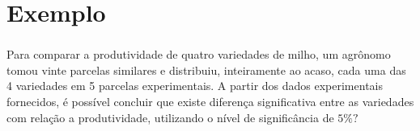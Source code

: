 \documentclass[14pt,aspectratio=1610]{beamer}
\begin{document}
\section{Exemplo}
\begin{frame}{}
\frametitle{}
\begin{block}{}
\justifying
Para comparar a produtividade de quatro variedades de milho, um agrônomo tomou
vinte parcelas similares e distribuiu, inteiramente ao acaso, cada uma das 4 variedades em 5 parcelas experimentais. A partir dos dados experimentais fornecidos, é possível concluir que existe diferença significativa entre as variedades com relação a produtividade, utilizando o nível de significância de $5\%?$
\vspace{-0.5cm}
\begin{table}[!h]
\end{table}
\end{block}
\end{frame}

\begin{frame}{}
\frametitle{}
\begin{block}{}
\justifying


\end{block}
\end{frame}

\begin{frame}{}
\frametitle{}
\begin{block}{}
\justifying


\end{block}
\end{frame}

\begin{frame}{}
\frametitle{}
\begin{block}{}
\justifying


\end{block}
\end{frame}
\end{document}
